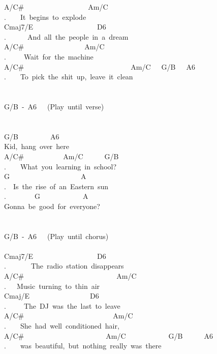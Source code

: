 {A/C\#\ \ \ \ \ \ \ \ \ \ \ \ \ \ \ \ \ \ Am/C\\
.\ \ \ \ It\ begins\ to\ explode\ \\
Cmaj7/E\ \ \ \ \ \ \ \ \ \ \ \ \ \ \ \ \ \ D6\\
.\ \ \ \ \ \ And\ all\ the\ people\ in\ a\ dream\ \\
A/C\#\ \ \ \ \ \ \ \ \ \ \ \ \ \ \ \ \ Am/C\\
.\ \ \ \ \ Wait\ for\ the\ machine\ \\
A/C\#\ \ \ \ \ \ \ \ \ \ \ \ \ \ \ \ \ \ \ \ \ \ \ \ \ \ \ \ \ \ Am/C\ \ \ G/B\ \ \ A6\\
.\ \ \ \ To\ pick\ the\ shit\ up,\ leave\ it\ clean\ \\
\\
\\
G/B\ -\ A6\ \ \ (Play\ until\ verse)\\
\\
\\
G/B\ \ \ \ \ \ \ \ \ A6\\
Kid,\ hang\ over\ here\ \\
A/C\#\ \ \ \ \ \ \ \ \ \ \ Am/C\ \ \ \ \ \ G/B\\
.\ \ \ \ What\ you\ learning\ in\ school?\ \\
G\ \ \ \ \ \ \ \ \ \ \ \ \ \ \ \ \ \ \ \ A\\
.\ \ Is\ the\ rise\ of\ an\ Eastern\ sun\ \\
.\ \ \ \ \ \ \ \ G\ \ \ \ \ \ \ \ \ \ \ \ A\\
Gonna\ be\ good\ for\ everyone?\ \\
\\
\\
G/B\ -\ A6\ \ \ (Play\ until\ chorus)\\
\\
Cmaj7/E\ \ \ \ \ \ \ \ \ \ \ \ \ \ \ \ \ \ D6\\
.\ \ \ \ \ \ \ The\ radio\ station\ disappears\ \\
A/C\#\ \ \ \ \ \ \ \ \ \ \ \ \ \ \ \ \ \ \ \ \ \ \ \ \ \ Am/C\\
.\ \ \ Music\ turning\ to\ thin\ air\ \\
Cmaj/E\ \ \ \ \ \ \ \ \ \ \ \ \ \ \ \ \ D6\\
.\ \ \ \ \ The\ DJ\ was\ the\ last\ to\ leave\ \\
A/C\#\ \ \ \ \ \ \ \ \ \ \ \ \ \ \ \ \ \ \ \ \ \ \ \ \ Am/C\\
.\ \ \ \ She\ had\ well\ conditioned\ hair,\ \\
A/C\#\ \ \ \ \ \ \ \ \ \ \ \ \ \ \ \ \ \ \ \ \ \ \ Am/C\ \ \ \ \ \ \ \ \ \ \ \ G/B\ \ \ \ \ \ A6\\
.\ \ \ \ was\ beautiful,\ but\ nothing\ really\ was\ there\\
\\}
